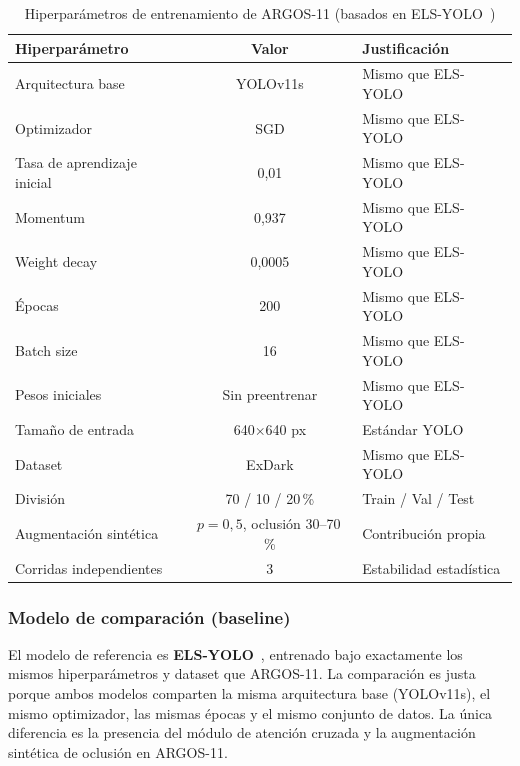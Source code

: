 \begin{table}[h!]
\centering
\caption{Hiperpar\'ametros de entrenamiento de ARGOS-11 (basados
en ELS-YOLO~\cite{ElsYolo2025})}
\label{tab:hiperparametros}
\renewcommand{\arraystretch}{1.3}
\begin{tabular}{|l|c|l|}
\hline
\textbf{Hiperpar\'ametro} & \textbf{Valor} & \textbf{Justificaci\'on} \\
\hline
Arquitectura base & YOLOv11s & Mismo que ELS-YOLO \\
\hline
Optimizador & SGD & Mismo que ELS-YOLO \\
\hline
Tasa de aprendizaje inicial & 0{,}01 & Mismo que ELS-YOLO \\
\hline
Momentum & 0{,}937 & Mismo que ELS-YOLO \\
\hline
Weight decay & 0{,}0005 & Mismo que ELS-YOLO \\
\hline
\'Epocas & 200 & Mismo que ELS-YOLO \\
\hline
Batch size & 16 & Mismo que ELS-YOLO \\
\hline
Pesos iniciales & Sin preentrenar & Mismo que ELS-YOLO \\
\hline
Tama\~{n}o de entrada & 640$\times$640 px & Est\'andar YOLO \\
\hline
Dataset & ExDark & Mismo que ELS-YOLO \\
\hline
Divisi\'on & 70 / 10 / 20\,\% & Train / Val / Test \\
\hline
Augmentaci\'on sint\'etica & $p = 0{,}5$, oclusi\'on 30--70\,\% & Contribuci\'on propia \\
\hline
Corridas independientes & 3 & Estabilidad estad\'{i}stica \\
\hline
\end{tabular}
\end{table}

\subsubsection{Modelo de comparaci\'on (baseline)}

El modelo de referencia es \textbf{ELS-YOLO}~\cite{ElsYolo2025},
entrenado bajo exactamente los mismos hiperpar\'ametros y dataset
que ARGOS-11. La comparaci\'on es justa porque ambos modelos
comparten la misma arquitectura base (YOLOv11s), el mismo
optimizador, las mismas \'epocas y el mismo conjunto de datos.
La \'unica diferencia es la presencia del m\'odulo de atenci\'on
cruzada y la augmentaci\'on sint\'etica de oclusi\'on en ARGOS-11.

